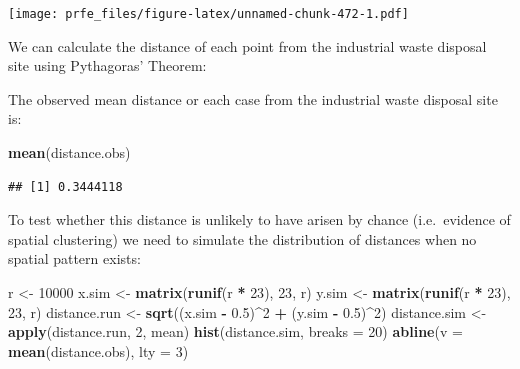 \documentclass[12pt,a4paper]{book}
\newenvironment{Shaded}{\begin{snugshade}}{\end{snugshade}}
\newcommand{\KeywordTok}[1]{\textcolor[rgb]{0.13,0.29,0.53}{\textbf{#1}}}
\newcommand{\DataTypeTok}[1]{\textcolor[rgb]{0.13,0.29,0.53}{#1}}
\newcommand{\DecValTok}[1]{\textcolor[rgb]{0.00,0.00,0.81}{#1}}
\newcommand{\FloatTok}[1]{\textcolor[rgb]{0.00,0.00,0.81}{#1}}
\newcommand{\StringTok}[1]{\textcolor[rgb]{0.31,0.60,0.02}{#1}}
\newcommand{\OperatorTok}[1]{\textcolor[rgb]{0.81,0.36,0.00}{\textbf{#1}}}
\newcommand{\NormalTok}[1]{#1}
\theoremstyle{definition}
\theoremstyle{definition}
\theoremstyle{definition}
\theoremstyle{remark}
\begin{document}
\texttt{[image: prfe\_files/figure-latex/unnamed-chunk-472-1.pdf]}

We can calculate the distance of each point from the industrial waste
disposal site using Pythagoras' Theorem:

\begin{Shaded}
\end{Shaded}

The observed mean distance or each case from the industrial waste
disposal site is:

\begin{Shaded}
\begin{Highlighting}[]
\KeywordTok{mean}\NormalTok{(distance.obs)}
\end{Highlighting}
\end{Shaded}

\begin{verbatim}
## [1] 0.3444118
\end{verbatim}

To test whether this distance is unlikely to have arisen by chance
(i.e.~evidence of spatial clustering) we need to simulate the
distribution of distances when no spatial pattern exists:

\begin{Shaded}
\begin{Highlighting}[]
\NormalTok{r <-}\StringTok{ }\DecValTok{10000}
\NormalTok{x.sim <-}\StringTok{ }\KeywordTok{matrix}\NormalTok{(}\KeywordTok{runif}\NormalTok{(r }\OperatorTok{*}\StringTok{ }\DecValTok{23}\NormalTok{), }\DecValTok{23}\NormalTok{, r)}
\NormalTok{y.sim <-}\StringTok{ }\KeywordTok{matrix}\NormalTok{(}\KeywordTok{runif}\NormalTok{(r }\OperatorTok{*}\StringTok{ }\DecValTok{23}\NormalTok{), }\DecValTok{23}\NormalTok{, r)}
\NormalTok{distance.run <-}\StringTok{ }\KeywordTok{sqrt}\NormalTok{((x.sim }\OperatorTok{-}\StringTok{ }\FloatTok{0.5}\NormalTok{)}\OperatorTok{^}\DecValTok{2} \OperatorTok{+}\StringTok{ }\NormalTok{(y.sim }\OperatorTok{-}\StringTok{ }\FloatTok{0.5}\NormalTok{)}\OperatorTok{^}\DecValTok{2}\NormalTok{)}
\NormalTok{distance.sim <-}\StringTok{ }\KeywordTok{apply}\NormalTok{(distance.run, }\DecValTok{2}\NormalTok{, mean)}
\KeywordTok{hist}\NormalTok{(distance.sim, }\DataTypeTok{breaks =} \DecValTok{20}\NormalTok{)}
\KeywordTok{abline}\NormalTok{(}\DataTypeTok{v =} \KeywordTok{mean}\NormalTok{(distance.obs), }\DataTypeTok{lty =} \DecValTok{3}\NormalTok{)}
\end{Highlighting}
\end{Shaded}
\end{document}
